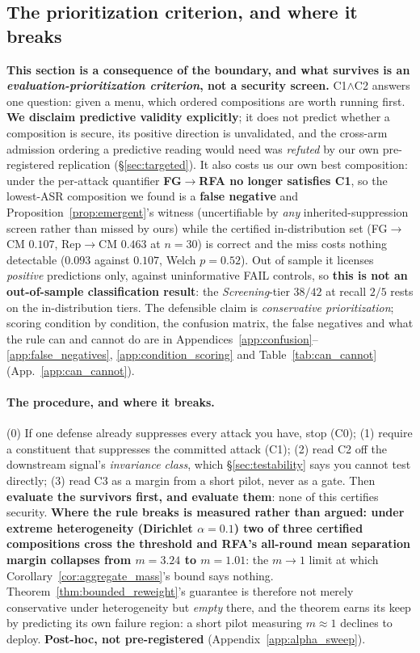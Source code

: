 \documentclass{article}
\begin{document}
\subsection{The prioritization criterion, and where it breaks}
\label{app:prioritization}

\textbf{This section is a consequence of the boundary, and what survives is an \emph{evaluation-prioritization criterion}, not a security screen.} C1$\wedge$C2 answers one question: given a menu, which ordered compositions are worth running first. \textbf{We disclaim predictive validity explicitly}; it does not predict whether a composition is secure, its positive direction is unvalidated, and the cross-arm admission ordering a predictive reading would need was \emph{refuted} by our own pre-registered replication (\S\ref{sec:targeted}). It also costs us our own best composition: under the per-attack quantifier \textbf{FG$\to$RFA no longer satisfies C1}, so the lowest-ASR composition we found is a \textbf{false negative} and Proposition~\ref{prop:emergent}'s witness (uncertifiable by \emph{any} inherited-suppression screen rather than missed by ours) while the certified in-distribution set (FG$\to$CM $0.107$, Rep$\to$CM $0.463$ at $n{=}30$) is correct and the miss costs nothing detectable ($0.093$ against $0.107$, Welch $p{=}0.52$). Out of sample it licenses \emph{positive} predictions only, against uninformative FAIL controls, so \textbf{this is not an out-of-sample classification result}: the \emph{Screening}-tier $38/42$ at recall $2/5$ rests on the in-distribution tiers. The defensible claim is \emph{conservative prioritization}; scoring condition by condition, the confusion matrix, the false negatives and what the rule can and cannot do are in Appendices~\ref{app:confusion}--\ref{app:false_negatives}, \ref{app:condition_scoring} and Table~\ref{tab:can_cannot} (App.~\ref{app:can_cannot}).

\paragraph{The procedure, and where it breaks.} (0) If one defense already suppresses every attack you have, stop (C0); (1) require a constituent that suppresses the committed attack (C1); (2) read C2 off the downstream signal's \emph{invariance class}, which \S\ref{sec:testability} says you cannot test directly; (3) read C3 as a margin from a short pilot, never as a gate. Then \textbf{evaluate the survivors first, and evaluate them}: none of this certifies security. \textbf{Where the rule breaks is measured rather than argued: under extreme heterogeneity (Dirichlet $\alpha{=}0.1$) two of three certified compositions cross the threshold and RFA's all-round mean separation margin collapses from $m{=}3.24$ to $m{=}1.01$}: the $m \to 1$ limit at which Corollary~\ref{cor:aggregate_mass}'s bound says nothing. Theorem~\ref{thm:bounded_reweight}'s guarantee is therefore not merely conservative under heterogeneity but \emph{empty} there, and the theorem earns its keep by predicting its own failure region: a short pilot measuring $m \approx 1$ declines to deploy. \textbf{Post-hoc, not pre-registered} (Appendix~\ref{app:alpha_sweep}).
\end{document}
